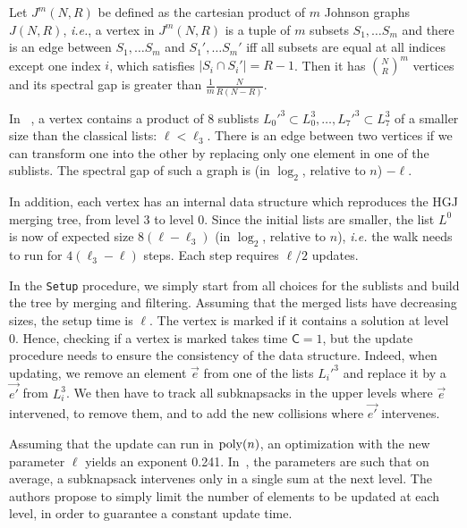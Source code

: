 \begin{theorem}
Let $J^m(N, R)$ be defined as the cartesian product of $m$ Johnson graphs $J(N,R)$, \emph{i.e.}, a vertex in $J^m(N, R)$ is a tuple of $m$ subsets $S_1, \ldots S_m$ and there is an edge between $S_1, \ldots S_m$ and $S_1', \ldots S_m'$ iff all subsets are equal at all indices except one index $i$, which satisfies $|S_i \cap S_i'| = R-1$. Then it has ${N \choose R}^{m}$ vertices and its spectral gap is greater than $\frac{1}{m} \frac{N}{R(N-R)}$.
\end{theorem}

In ~\cite{DBLP:conf/pqcrypto/BernsteinJLM13}, a vertex contains a product of 8 sublists $L_0'^3 \subset L_0^3, \ldots, L_7'^3 \subset L_7^3$ of a smaller size than the classical lists: $\ell < \ell_3$. There is an edge between two vertices if we can transform one into the other by replacing only one element in one of the sublists. The spectral gap of such a graph is (in $\log_2$, relative to $n$) $- \ell$.

In addition, each vertex has an internal data structure which reproduces the HGJ merging tree, from level 3 to level 0. Since the initial lists are smaller, the list $L^0$ is now of expected size $8(\ell - \ell_3)$ (in $\log_2$, relative to $n$), \emph{i.e.} the walk needs to run for $4(\ell_3 - \ell)$ steps. Each step requires $\ell / 2$ updates.

In the \texttt{Setup} procedure, we simply start from all choices for the sublists and build the tree by merging and filtering. Assuming that the merged lists have decreasing sizes, the setup time is $\ell$. The vertex is marked if it contains a solution at level 0. Hence, checking if a vertex is marked takes time $\mathsf{C} = 1$, but the update procedure needs to ensure the consistency of the data structure. Indeed, when updating, we remove an element $\vec{e}$ from one of the lists $L_i'^3$ and replace it by a $\vec{e'}$ from $L_i^3$. We then have to track all subknapsacks in the upper levels where $\vec{e}$ intervened, to remove them, and to add the new collisions where $\vec{e'}$ intervenes.

Assuming that the update can run in $\operatorname{poly}(n)$, an optimization with the new parameter $\ell$ yields an exponent 0.241. In~\cite{DBLP:conf/pqcrypto/BernsteinJLM13}, the parameters are such that on average, a subknapsack intervenes only in a single sum at the next level. The authors propose to simply limit the number of elements to be updated at each level, in order to guarantee a constant update time.

